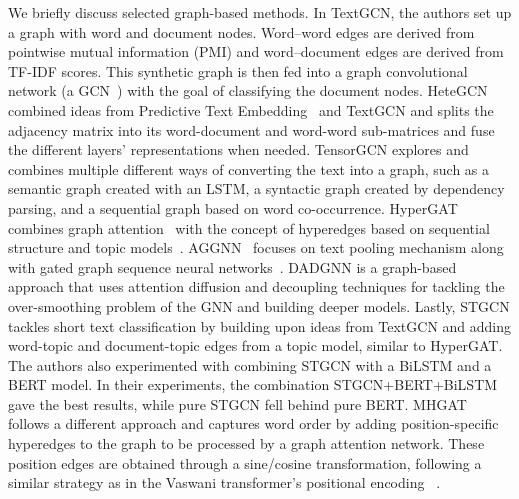 \documentclass[acmsmall,nonacm]{acmart}
\begin{document}
We briefly discuss selected graph-based methods.
In TextGCN, the authors set up a graph with word and document nodes. Word--word edges are derived from pointwise mutual information (PMI) and word--document edges are derived from TF-IDF scores.
This synthetic graph is then fed into a graph convolutional network (\eg a GCN~\cite{DBLP:conf/iclr/KipfW17}) with the goal of classifying the document nodes.
HeteGCN combined ideas from Predictive Text Embedding~\cite{DBLP:conf/kdd/TangQM15} and TextGCN and splits the adjacency matrix into its word-document and word-word sub-matrices and fuse the different layers' representations when needed.
TensorGCN explores and combines multiple different ways of converting the text into a graph, such as a semantic graph created with an LSTM, a syntactic graph created by dependency parsing, and a sequential graph based on word co-occurrence. 
HyperGAT combines graph attention~\cite{velickovic2018graph} with the concept of hyperedges based on sequential structure and topic models~\cite{DBLP:journals/jmlr/BleiNJ03}.
AGGNN~\cite{aggnn} focuses on text pooling mechanism along with gated graph sequence neural networks~\cite{DBLP:journals/corr/LiTBZ15}.
DADGNN is a graph-based approach that uses attention diffusion and decoupling techniques for tackling the over-smoothing problem of the GNN and building deeper models. 
Lastly, STGCN tackles short text classification by building upon ideas from TextGCN and adding word-topic and document-topic edges from a topic model, similar to HyperGAT.
The authors also experimented with combining STGCN with a BiLSTM and a BERT model.
In their experiments, the combination STGCN+BERT+BiLSTM gave the best results, while pure STGCN fell behind pure BERT. MHGAT~\cite{mhgat} follows a different approach and captures word order by adding position-specific hyperedges to the graph to be processed by a graph attention network. These position edges are obtained through a sine/cosine transformation, following a similar strategy as in the Vaswani transformer's positional encoding ~\cite{DBLP:conf/nips/VaswaniSPUJGKP17}.
\end{document}
